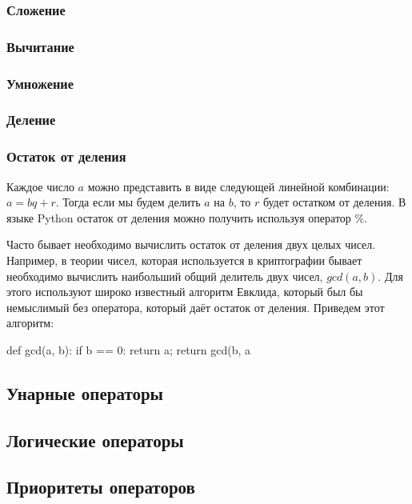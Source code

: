 \subsubsection{Сложение}

\subsubsection{Вычитание}

\subsubsection{Умножение}

\subsubsection{Деление}

\subsubsection{Остаток от деления}

Каждое число $a$ можно представить в виде следующей линейной комбинации: $a=bq+r$.
Тогда если мы будем делить $a$ на $b$, то $r$ будет остатком от деления. В языке Python
остаток от деления можно получить используя оператор $\%$.

Часто бывает необходимо вычислить остаток от деления двух целых чисел. Например,
в теории чисел, которая используется в криптографии бывает необходимо вычислить 
наибольший общий делитель двух чисел, $gcd(a, b)$. Для этого используют широко известный 
алгоритм Евклида, который был бы немыслимый без оператора, который даёт
остаток от деления. Приведем этот алгоритм:

\begin{python}
def gcd(a, b):
	if b == 0:
		return a;
	return gcd(b, a %
\end{python}

\subsection{Унарные операторы}

\subsection{Логические операторы}

\subsection{Приоритеты операторов}

